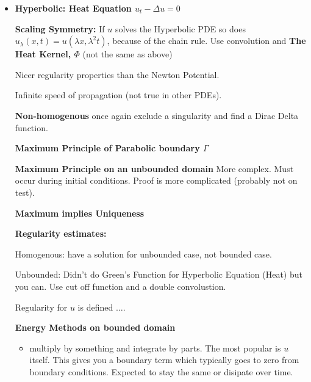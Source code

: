 \documentclass[12pt,a4paper]{report}
\begin{document}
{\begin{description}
\begin{itemize}
\begin{itemize}
			The solution for 
			\begin{align*}
				\BINDEF{\Delta u, & x \in U}{u(x)=g(x), & x \in \partial U}
			\end{align*}is the function that minimizes \textit{Dirichlet Energy}
			\begin{align*}
				E[v] = \int_U |\Delta u|^2\,dx
			\end{align*}over the set of admissable functtions on the boundary.
			
			\item \textbf{On the test} use some of these details.  stuff where you'd have to just ``know" to use MVP versus something else.
			
		\end{itemize}
		
		\item \textbf{Hyperbolic: Heat Equation $u_t-\Delta u=0$}
		
		\textbf{Scaling Symmetry: }If $u$ solves the Hyperbolic PDE so does $u_\lambda(x,t) = u(\lambda x, \lambda^2 t)$, because of the chain rule. Use convolution and \textbf{The Heat Kernel, $\Phi$} (not the same as above)
		
		Nicer regularity properties than the Newton Potential.
		
		Infinite speed of propagation (not true in other PDEs).
		
		\textbf{Non-homogenous} once again exclude a singularity and find a Dirac Delta function.
		
		\textbf{Maximum Principle of Parabolic boundary $\Gamma$}
		
		\textbf{Maximum Principle on an unbounded domain} More complex.  Must occur during initial conditions.  Proof is more complicated (probably not on test).
		
		\textbf{Maximum implies Uniqueness}
		
		\textbf{Regularity estimates:}
		
		Homogenous: have a solution for unbounded case, not bounded case.
		
		Unbounded: Didn't do Green's Function for Hyperbolic Equation (Heat) but you can.  Use cut off function and a double convolustion.
		
		Regularity for $u$ is defined $\dots$.
		
		\textbf{Energy Methods on bounded domain}  
		\begin{itemize}
			\item multiply by something and integrate by parts.  The most popular is $u$ itself.  This gives you a boundary term which typically goes to zero from boundary conditions.  Expected to stay the same or disipate over time.
		\end{itemize}
	

\end{itemize}
\end{description}}
\end{document}
